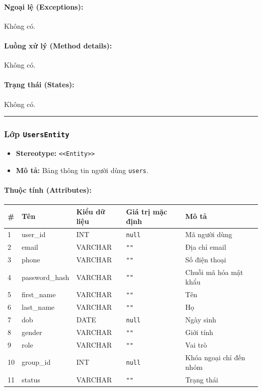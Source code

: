 \documentclass[12pt,a4paper]{article}
\begin{document}
\paragraph{Ngoại lệ (Exceptions):}
Không có.

\paragraph{Luồng xử lý (Method details):}
Không có.

\paragraph{Trạng thái (States):}
Không có.

\vskip 0.5cm
\noindent\rule{\textwidth}{0.5pt}
\vskip 0.5cm

\subsubsection{Lớp \texttt{UsersEntity}}

\begin{itemize}[leftmargin=*]
    \item \textbf{Stereotype:} \texttt{\textless{}\textless{}Entity\textgreater{}\textgreater{}}
    \item \textbf{Mô tả:} Bảng thông tin người dùng \texttt{users}.
\end{itemize}

\paragraph{Thuộc tính (Attributes):}
\begin{longtable}{|p{0.6cm}|p{3.5cm}|p{2.4cm}|p{1.8cm}|p{5.1cm}|}
\hline
\textbf{\#} & \textbf{Tên} & \textbf{Kiểu dữ liệu} & \textbf{Giá trị mặc định} & \textbf{Mô tả} \\ \hline
\endhead
1 & user\_id & INT & \texttt{null} & Mã người dùng \\ \hline
2 & email & VARCHAR & \texttt{""} & Địa chỉ email \\ \hline
3 & phone & VARCHAR & \texttt{""} & Số điện thoại \\ \hline
4 & password\_hash & VARCHAR & \texttt{""} & Chuỗi mã hóa mật khẩu \\ \hline
5 & first\_name & VARCHAR & \texttt{""} & Tên \\ \hline
6 & last\_name & VARCHAR & \texttt{""} & Họ \\ \hline
7 & dob & DATE & \texttt{null} & Ngày sinh \\ \hline
8 & gender & VARCHAR & \texttt{""} & Giới tính \\ \hline
9 & role & VARCHAR & \texttt{""} & Vai trò \\ \hline
10 & group\_id & INT & \texttt{null} & Khóa ngoại chỉ đến nhóm \\ \hline
11 & status & VARCHAR & \texttt{""} & Trạng thái \\ \hline
\end{longtable}
\end{document}
